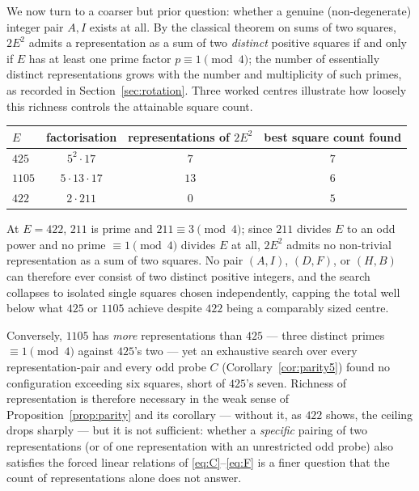 \documentclass[12pt]{article}
\theoremstyle{remark}
\begin{document}
We now turn to a coarser but prior question: whether a genuine
(non-degenerate) integer pair $A,I$ exists at all. By the classical
theorem on sums of two squares, $2E^2$ admits a representation as a sum
of two \emph{distinct} positive squares if and only if $E$ has at least
one prime factor $p\equiv1\pmod4$; the number of essentially distinct
representations grows with the number and multiplicity of such primes,
as recorded in Section~\ref{sec:rotation}. Three worked centres
illustrate how loosely this richness controls the attainable square
count.

\begin{center}
\begin{tabular}{lccc}
\hline
$E$ & factorisation & representations of $2E^2$ & best square count found \\
\hline
$425$  & $5^2 \cdot 17$      & $7$  & $7$ \\
$1105$ & $5 \cdot 13 \cdot 17$ & $13$ & $6$ \\
$422$  & $2 \cdot 211$       & $0$  & $5$ \\
\hline
\end{tabular}
\end{center}

At $E=422$, $211$ is prime and $211\equiv3\pmod4$; since $211$ divides
$E$ to an odd power and no prime $\equiv1\pmod4$ divides $E$ at all,
$2E^2$ admits no non-trivial representation as a sum of two squares.
No pair $(A,I)$, $(D,F)$, or $(H,B)$ can therefore ever consist of two
distinct positive integers, and the search collapses to isolated single
squares chosen independently, capping the total well below what $425$
or $1105$ achieve despite $422$ being a comparably sized centre.

Conversely, $1105$ has \emph{more} representations than $425$ ---
three distinct primes $\equiv1\pmod4$ against $425$'s two --- yet an
exhaustive search over every representation-pair and every odd probe
$C$ (Corollary~\ref{cor:parity5}) found no configuration exceeding six
squares, short of $425$'s seven. Richness of representation is
therefore necessary in the weak sense of Proposition~\ref{prop:parity}
and its corollary --- without it, as $422$ shows, the ceiling drops
sharply --- but it is not sufficient: whether a \emph{specific} pairing
of two representations (or of one representation with an unrestricted
odd probe) also satisfies the forced linear relations of
\eqref{eq:C}--\eqref{eq:F} is a finer question that the count of
representations alone does not answer.
\end{document}
